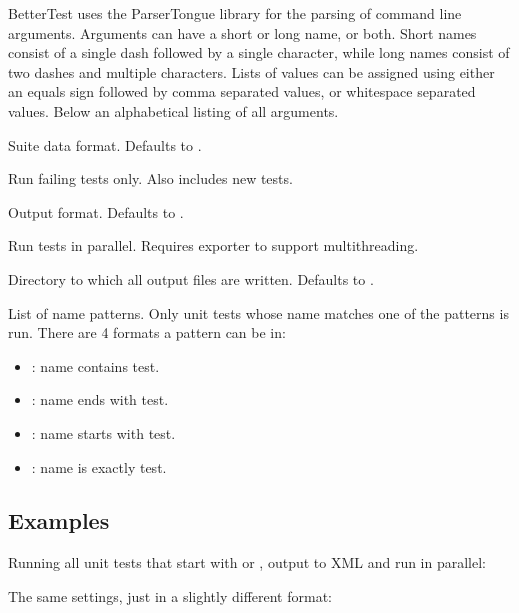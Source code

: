 BetterTest uses the ParserTongue library for the parsing of command line arguments. Arguments can have a short or long name, or both. Short names consist of a single dash followed by a single character, while long names consist of two dashes and multiple characters. Lists of values can be assigned using either an equals sign followed by comma separated values, or whitespace separated values. Below an alphabetical listing of all arguments.


Suite data format. Defaults to .


Run failing tests only. Also includes new tests.


Output format. Defaults to .


Run tests in parallel. Requires exporter to support multithreading.


Directory to which all output files are written. Defaults to .


List of name patterns. Only unit tests whose name matches one of the patterns is run. There are 4 formats a pattern can be in:

\begin{itemize}
	\item {}: name contains test.
	\item {}: name ends with test.
	\item {}: name starts with test.
	\item {}: name is exactly test.
\end{itemize}

\subsection{Examples}
\label{section:cmd:examples}

Running all unit tests that start with  or , output to XML and run in parallel:


The same settings, just in a slightly different format:

